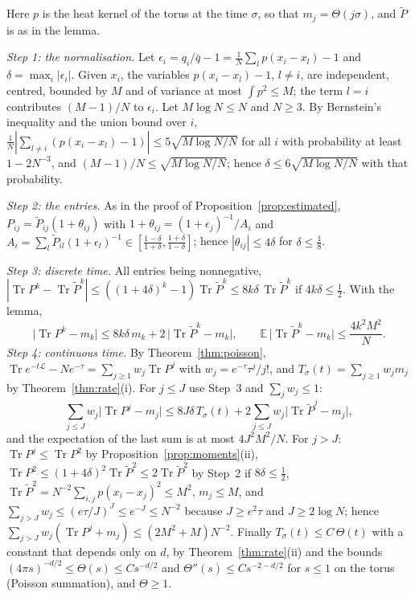 \documentclass[11pt,a4paper]{article}
\makeatletter
\theoremstyle{stmt}
\theoremstyle{defn}
\theoremstyle{rmk}
\renewenvironment{proof}[1][\proofname]{\par\pushQED{\qed}\normalfont\topsep6\p@\@plus6\p@\relax
  \trivlist\item[\hskip\labelsep{\sffamily\itshape\small #1.}]\ignorespaces}{\popQED\endtrivlist\@endpefalse}
\numberwithin{equation}{section}
\DeclareMathOperator{\Tr}{Tr}
\newcommand{\Lc}{\mathcal{L}}
\makeatother
\begin{document}
{\begin{proof}
Here $p$ is the heat kernel of the torus at the time $\sigma$, so that $m_j=\Theta(j\sigma)$, and $\tilde P$ is as in the lemma.

\emph{Step 1: the normalisation.} Let $\epsilon_i=q_i/\bar q-1=\frac1N\sum_lp(x_i-x_l)-1$ and $\delta=\max_i|\epsilon_i|$. Given $x_i$, the variables $p(x_i-x_l)-1$, $l\ne i$, are independent, centred, bounded by $M$ and of variance at most $\int p^2\le M$; the term $l=i$ contributes $(M-1)/N$ to $\epsilon_i$. Let $M\log N\le N$ and $N\ge3$. By Bernstein's inequality and the union bound over $i$, $\frac1N|\sum_{l\ne i}(p(x_i-x_l)-1)|\le5\sqrt{M\log N/N}$ for all $i$ with probability at least $1-2N^{-3}$, and $(M-1)/N\le\sqrt{M\log N/N}$; hence $\delta\le6\sqrt{M\log N/N}$ with that probability.

\emph{Step 2: the entries.} As in the proof of Proposition~\ref{prop:estimated}, $P_{ij}=\tilde P_{ij}(1+\theta_{ij})$ with $1+\theta_{ij}=(1+\epsilon_j)^{-1}/A_i$ and $A_i=\sum_l\tilde P_{il}(1+\epsilon_l)^{-1}\in[\frac{1-\delta}{1+\delta},\frac{1+\delta}{1-\delta}]$; hence $|\theta_{ij}|\le4\delta$ for $\delta\le\frac18$.

\emph{Step 3: discrete time.} All entries being nonnegative, $|\Tr P^k-\Tr\tilde P^k|\le((1+4\delta)^k-1)\Tr\tilde P^k\le8k\delta\,\Tr\tilde P^k$ if $4k\delta\le\frac12$. With the lemma,
\[
\big|\Tr P^k-m_k\big|\le8k\delta\,m_k+2\,\big|\Tr\tilde P^k-m_k\big|,\qquad\mathbb E\,\big|\Tr\tilde P^k-m_k\big|\le\frac{4k^2M^2}{N}.
\]
\emph{Step 4: continuous time.} By Theorem~\ref{thm:poisson}, $\Tr e^{-t\Lc}-Ne^{-\tau}=\sum_{j\ge1}w_j\Tr P^j$ with $w_j=e^{-\tau}\tau^j/j!$, and $T_\sigma(t)=\sum_{j\ge1}w_jm_j$ by Theorem~\ref{thm:rate}(i). For $j\le J$ use Step~3 and $\sum_jw_j\le1$:
\[
\sum_{j\le J}w_j\big|\Tr P^j-m_j\big|\le8J\delta\,T_\sigma(t)+2\sum_{j\le J}w_j\big|\Tr\tilde P^j-m_j\big|,
\]
and the expectation of the last sum is at most $4J^2M^2/N$. For $j>J$: $\Tr P^j\le\Tr P^2$ by Proposition~\ref{prop:moments}(ii), $\Tr P^2\le(1+4\delta)^2\Tr\tilde P^2\le2\Tr\tilde P^2$ by Step~2 if $8\delta\le\frac12$, $\Tr\tilde P^2=N^{-2}\sum_{i,j}p(x_i-x_j)^2\le M^2$, $m_j\le M$, and $\sum_{j>J}w_j\le(e\tau/J)^J\le e^{-J}\le N^{-2}$ because $J\ge e^2\tau$ and $J\ge2\log N$; hence $\sum_{j>J}w_j(\Tr P^j+m_j)\le(2M^2+M)N^{-2}$. Finally $T_\sigma(t)\le C\,\Theta(t)$ with a constant that depends only on $d$, by Theorem~\ref{thm:rate}(ii) and the bounds $(4\pi s)^{-d/2}\le\Theta(s)\le Cs^{-d/2}$ and $\Theta''(s)\le Cs^{-2-d/2}$ for $s\le1$ on the torus (Poisson summation), and $\Theta\ge1$.


\end{proof}}
\end{document}

